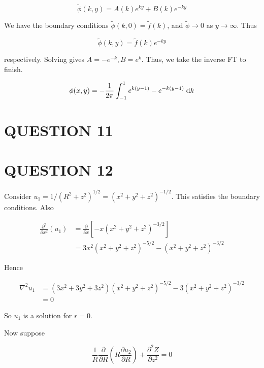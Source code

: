 \documentclass[a4paper]{article}
\begin{document}
\begin{enumerate}
	\[ \tilde{\phi}(k,y) = A(k) e^{ky} + B(k) e^{-ky}  \]
	
	We have the boundary conditions $ \tilde{\phi}(k,0) = \tilde{f}(k) $, and $ \tilde{\phi} \to 0 $ as $ y \to \infty $. Thus

	\[ \tilde{\phi}(k,y) = \tilde{f}(k) e^{-ky}  \]
	
	respectively. Solving gives $  A = - e^{-k}, B = e^{k} $. Thus, we take the inverse FT to finish.
	
	\begin{align*}
	\phi(x,y) &  = - \frac{1}{2\pi}  \int_{-1}^{1} e^{k(y-1)} - e^{-k(y-1)} \; \mathrm{d} k \\
	\end{align*}
	

	
\end{enumerate}




\section{QUESTION 11}

\section{QUESTION 12}

Consider $ u_{1} = 1/(R^{2} + z^{2})^{1/2} = (x^{2} + y^{2} + z^{2})^{-1/2} $.
This satisfies the boundary conditions. Also


\begin{align*}
\frac{\partial^{2} }{\partial x^{2}} (u_{1}) & = \frac{\partial }{\partial x} \left[ - x (x^{2} + y^{2} + z^{2})^{-3/2}   \right]  \\
& = 3x^{2} (x^{2} + y^{2} + z^{2})^{-5/2} - (x^{2} + y^{2} + z^{2})^{-3/2} 
\end{align*}

Hence 

\begin{align*}
\nabla^{2} u_{1} & = (3x^{2} + 3y^{2} + 3z^{2})(x^{2} + y^{2} + z^{2})^{-5/2} - 3 (x^{2} + y^{2} + z^{2})^{-3/2} \\
& = 0
\end{align*}

So $ u_{1} $ is a solution for $ r = 0 $.

Now suppose 

\[ \frac{1}{R} \frac{\partial }{\partial R} \left(  R \frac{\partial u_{2} }{\partial R} \right) + \frac{\partial^{2} Z }{\partial z^{2}}  = 0\]
\end{document}
